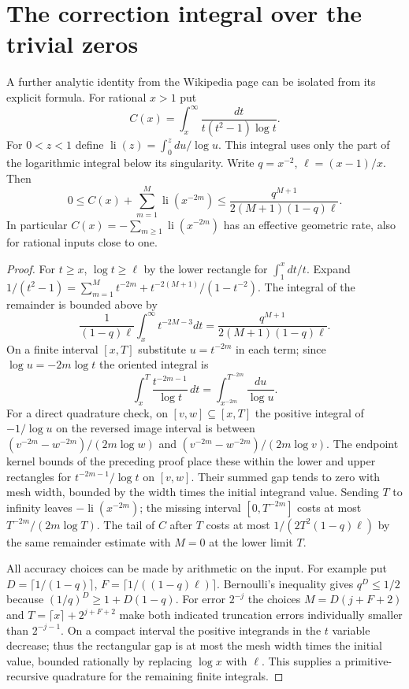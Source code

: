

\section{The correction integral over the trivial zeros}
\label{sec:trivial}
A further analytic identity from the Wikipedia page can be isolated from its explicit formula. For rational $x>1$ put
\[
 C(x)=\int_x^\infty\frac{dt}{t(t^2-1)\log t}.
\]
For $0<z<1$ define $\operatorname{li}(z)=\int_0^z du/\log u$. This integral uses only the part of the logarithmic integral below its singularity. Write $q=x^{-2}$, $\ell=(x-1)/x$. Then
\[
 0\le C(x)+\sum_{m=1}^M\operatorname{li}(x^{-2m})
    \le \frac{q^{M+1}}{2(M+1)(1-q)\ell}.
\]
In particular $C(x)=-\sum_{m\ge1}\operatorname{li}(x^{-2m})$ has an effective geometric rate, also for rational inputs close to one.

\begin{proof}
For $t\ge x$, $\log t\ge\ell$ by the lower rectangle for $\int_1^x dt/t$. Expand $1/(t^2-1)=\sum_{m=1}^M t^{-2m}+t^{-2(M+1)}/(1-t^{-2})$. The integral of the remainder is bounded above by
\[
 \frac1{(1-q)\ell}\int_x^\infty t^{-2M-3}dt
   =\frac{q^{M+1}}{2(M+1)(1-q)\ell}.
\]
On a finite interval $[x,T]$ substitute $u=t^{-2m}$ in each term; since $\log u=-2m\log t$ the oriented integral is
\[
 \int_x^T\frac{t^{-2m-1}}{\log t}\,dt
   =\int_{x^{-2m}}^{T^{-2m}}\frac{du}{\log u}.
\]
For a direct quadrature check, on $[v,w]\subseteq[x,T]$ the positive integral of $-1/\log u$ on the reversed image interval is between
$(v^{-2m}-w^{-2m})/(2m\log w)$ and $(v^{-2m}-w^{-2m})/(2m\log v)$. The endpoint kernel bounds of the preceding proof place these within the lower and upper rectangles for $t^{-2m-1}/\log t$ on $[v,w]$. Their summed gap tends to zero with mesh width, bounded by the width times the initial integrand value. Sending $T$ to infinity leaves $-\operatorname{li}(x^{-2m})$; the missing interval $[0,T^{-2m}]$ costs at most $T^{-2m}/(2m\log T)$. The tail of $C$ after $T$ costs at most $1/(2T^2(1-q)\ell)$ by the same remainder estimate with $M=0$ at the lower limit $T$.

All accuracy choices can be made by arithmetic on the input. For example put $D=\lceil 1/(1-q)\rceil$, $F=\lceil 1/((1-q)\ell)\rceil$. Bernoulli's inequality gives $q^D\le1/2$ because $(1/q)^D\ge1+D(1-q)$. For error $2^{-j}$ the choices $M=D(j+F+2)$ and $T=\lceil x\rceil+2^{j+F+2}$ make both indicated truncation errors individually smaller than $2^{-j-1}$. On a compact interval the positive integrands in the $t$ variable decrease; thus the rectangular gap is at most the mesh width times the initial value, bounded rationally by replacing $\log x$ with $\ell$. This supplies a primitive-recursive quadrature for the remaining finite integrals.
\end{proof}

